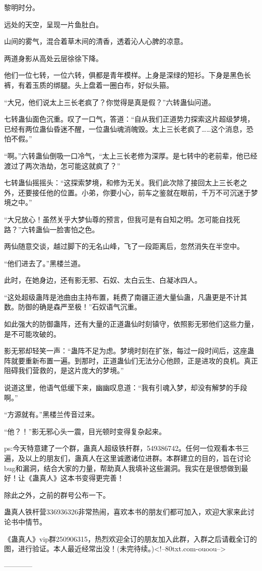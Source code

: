 \begin{this_body}
黎明时分。

远处的天空，呈现一片鱼肚白。

山间的雾气，混合着草木间的清香，透着沁人心脾的凉意。

两道身影从高处云层徐徐下降。

他们一位七转，一位六转，俱都是青年模样。上身是深绿的短衫。下身是黑色长裤，有着玉质的绑腿。头上盘着一圈白布，好似头箍。

“大兄，他们说太上三长老疯了？你觉得是真是假？”六转蛊仙问道。

七转蛊仙面色沉重。叹了一口气，答道：“自从我们正道势力探索这片超级梦境，已经有两位蛊仙昏迷不醒，一位蛊仙魂消魄毁。太上三长老疯了……这个消息，恐怕不假。”

“啊。”六转蛊仙倒吸一口冷气，“太上三长老修为深厚。是七转中的老前辈，他已经渡过了两次浩劫，怎可能这就疯了？”

七转蛊仙摇摇头：“这探索梦境，和修为无关。我们此次除了接回太上三长老之外，还要接任他的位置。小弟，你要小心，前车之鉴就在眼前，千万不可沉迷于梦境之中。”

“大兄放心！虽然关乎大梦仙尊的预言，但我可是有自知之明。怎可能自找死路？”六转蛊仙一脸害怕之色。

两仙随意交谈，越过脚下的无名山峰，飞了一段距离后，忽然消失在半空中。

“他们进去了。”黑楼兰道。

此时，在她身边，还有影无邪、石奴、太白云生、白凝冰四人。

“这处超级蛊阵是池曲由主持布置，耗费了南疆正道大量仙蛊，凡蛊更是不计其数。防御的确是森严至极！”石奴语气沉重。

如此强大的防御蛊阵，还有大量的正道蛊仙时刻镇守，依照影无邪他们这些力量，是不可能攻破的。

影无邪却轻笑一声：“蛊阵不足为虑。梦境时刻在扩张，每过一段时间后，这座蛊阵就要重新布置一遍。到那时，正道蛊仙们无法分心他顾，正是进攻的良机。真正阻碍我们营救的，是这片庞大的梦境。”

说道这里，他语气低缓下来，幽幽叹息道：“我有引魂入梦，却没有解梦的手段啊。”

“方源就有。”黑楼兰传音过来。

“他？！”影无邪心头一震，目光顿时变得复杂起来。

ps:今天特意建了一个群，蛊真人超级铁杆群，549386742。任何一位观看本书三遍，及以上的朋友们，蛊真人在这里诚邀诸位进群。本群建立的目的，旨在讨论bug和漏洞，结合大家的力量，帮助真人我填补这些漏洞。我实在是很想做到最好！让《蛊真人》这本书变得更完善！

除此之外，之前的群号公布一下。

蛊真人铁杆营336936326非常热闹，喜欢本书的朋友们都可加入，欢迎大家来此讨论书中情节。

《蛊真人》vip群250906315，热烈欢迎全订的朋友加入此群，入群之后请截全订的图，进行验证。本人最近经常出没！(未完待续。)<!--80txt.com-ouoou-->

------------

\end{this_body}

